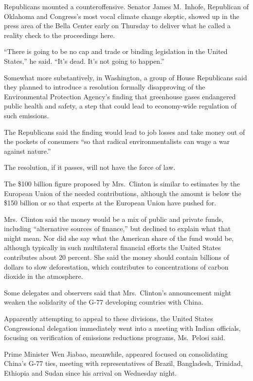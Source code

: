 ﻿\documentclass[12pt]{article}
\begin{document}
Republicans mounted a counteroffensive. Senator James M.~Inhofe, Republican of Oklahoma and
Congress's most vocal climate change skeptic, showed up in the press area of the Bella Center early
on Thursday to deliver what he called a reality check to the proceedings here.

``There is going to be no cap and trade or binding legislation in the United States,'' he said.
``It's dead. It's not going to happen.''

Somewhat more substantively, in Washington, a group of House Republicans said they planned to
introduce a resolution formally disapproving of the Environmental Protection Agency's finding that
greenhouse gases endangered public health and safety, a step that could lead to economy-wide
regulation of such emissions.

The Republicans said the finding would lead to job losses and take money out of the pockets of
consumers ``so that radical environmentalists can wage a war against nature.''

The resolution, if it passes, will not have the force of law.

The \$100 billion figure proposed by Mrs.~Clinton is similar to estimates by the European Union of
the needed contributions, although the amount is below the \$150 billion or so that experts at the
European Union have pushed for.

Mrs.~Clinton said the money would be a mix of public and private funds, including ``alternative
sources of finance,'' but declined to explain what that might mean. Nor did she say what the
American share of the fund would be, although typically in such multilateral financial efforts the
United States contributes about 20 percent. She said the money should contain billions of dollars to
slow deforestation, which contributes to concentrations of carbon dioxide in the atmosphere.

Some delegates and observers said that Mrs.~Clinton's announcement might weaken the solidarity of
the G-77 developing countries with China.

Apparently attempting to appeal to these divisions, the United States Congressional delegation
immediately went into a meeting with Indian officials, focusing on verification of emissions
reductions programs, Ms.~Pelosi said.

Prime Minister Wen Jiabao, meanwhile, appeared focused on consolidating China's G-77 ties, meeting
with representatives of Brazil, Bangladesh, Trinidad, Ethiopia and Sudan since his arrival on
Wednesday night.
\end{document}
